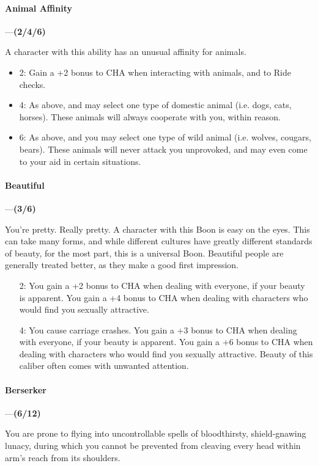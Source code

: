\documentclass[oneside,11pt,english]{book}
\begin{document}
\paragraph{\label{boon:Animal Affinity}Animal Affinity}\!---\quad \textbf{(2/4/6)}\par
A character with this ability has an unusual affinity for animals. 
\begin{itemize}
	\item 2: Gain a +2 bonus to CHA when interacting with animals, and to Ride checks. 
	\item 4: As above, and may select one type of domestic animal (i.e. dogs, cats, horses). These animals will always cooperate with you, within reason. 
	\item 6: As above, and you may select one type of wild animal (i.e. wolves, cougars, bears). These animals will never attack you unprovoked, and may even come to your aid in certain situations. 
\end{itemize}

\paragraph{\label{boon:Beautiful}Beautiful}---\quad \textbf{(3/6)}\par
You're pretty. Really pretty. A character with this Boon is easy on the eyes. This can take many forms, 
and while different cultures have greatly different standards of beauty, for the most part, this is a universal 
Boon. Beautiful people are generally treated better, as they make a good first impression. 

\begin{itemize}
\item [2:] You gain a +2 bonus to CHA when dealing with everyone, if your beauty is apparent. You gain a +4 bonus to CHA when dealing with characters who would find you sexually attractive.
\item [4:] You cause carriage crashes. You gain a +3 bonus to CHA when dealing with everyone, if your beauty is apparent. You gain a +6 bonus to CHA when dealing with characters who would find you sexually attractive. Beauty of this caliber often comes with unwanted attention.
\end{itemize}
\paragraph{\label{boon:Berserker}Berserker}---\quad \textbf{(6/12)}\par
You are prone to flying into uncontrollable spells of bloodthirsty, shield-gnawing lunacy, during which 
you cannot be prevented from cleaving every head within arm's reach from its shoulders. 
\end{document}
